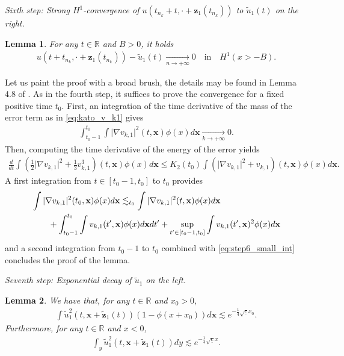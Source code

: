 \documentclass[reqno,10pt]{amsart}
\newtheorem{lemm}{Lemma}[section]
\numberwithin{equation}{section}
\newcommand{\bx}{\mathbf{x}}
\newcommand{\bz}{\mathbf{z}}
\begin{document}
		\vspace{0.5cm}
  \noindent\textit{Sixth step: Strong $H^1$-convergence of $u\left(t_{n_k}+t, \cdot + \bz_1(t_{n_k}) \right)$ to $\tilde{u}_{1}(t)$ on the right.}
		
		\begin{lemm}
			For any $t\in \mathbb{R}$ and $B>0$, it holds
			\begin{align*}
				u \left( t+t_{n_k}, \cdot + \bz_1(t_{n_k}) \right) - \tilde{u}_{1}(t) \underset{n \rightarrow + \infty}{\rightarrow} 0 \quad \text{in} \quad H^1(x>-B).
			\end{align*}
		\end{lemm}
		
		Let us paint the proof with a broad brush, the details may be found in Lemma 4.8 of \cite{CMPS16}. As in the fourth step, it suffices to prove the convergence for a fixed positive time $t_0$. First, an integration of the time derivative of the mass of the error term as in \eqref{eq:kato_v_k1} gives
		\begin{align}\label{eq:step6_small_int}
			\int_{t_0-1}^{t_0} \int \vert \nabla v_{k,1} \vert^2(t, \bx) \phi (x) d\bx \underset{k \rightarrow +\infty}{\rightarrow} 0.
		\end{align}
		Then, computing the time derivative of the energy of the error yields
		\begin{align*}
			\frac{d}{dt} \int \left( \frac12 \vert \nabla v_{k,1} \vert^2 + \frac13 v_{k,1}^3 \right) (t,\bx) \phi(x) d\bx \leq K_2(t_0) \int \left( \vert \nabla v_{k,1} \vert ^2 + v_{k,1} \right)(t,\bx) \phi(x) d\bx.
		\end{align*}
		A first integration from $t \in [t_0-1,t_0]$ to $t_0$ provides
		\begin{align*}
			\MoveEqLeft
			\int \vert \nabla v_{k,1} \vert^2 (t_0,\bx) \phi(x) d\bx \lesssim_{t_0} \int \vert \nabla v_{k,1} \vert^2 (t, \bx) \phi(x) d\bx \\
			& + \int_{t_0-1}^{t_0} \int v_{k,1} (t',\bx) \phi(x) d\bx dt' + \sup_{t' \in [t_0-1,t_0]} \int v_{k,1} (t',\bx)^2 \phi(x) d\bx 
		\end{align*}
		and a second integration from $t_0-1$ to $t_0$ combined with \eqref{eq:step6_small_int} concludes the proof of the lemma.
		
		
		\vspace{0.5cm}
  \noindent\textit{Seventh step: Exponential decay of $\tilde{u}_1$ on the left.}
    \begin{lemm} \label{lemm:mono_left}
			We have that, for any $t\in \mathbb{R}$ and $x_0>0$,
			\begin{align*}
				\int \tilde{u}_1^2\left(t,\bx + \tilde{\bz}_1(t) \right) \left( 1- \phi(x+x_0) \right) d\bx \lesssim e^{-\frac14 \sqrt{\underline{c}} x_0}.
			\end{align*}
			Furthermore, for any $t\in \mathbb{R}$ and $x<0$,
			\begin{align*}
				\int_y \tilde{u}_1^2\left(t,\bx+ \tilde{\bz}_1(t) \right) dy \lesssim e^{-\frac14 \sqrt{\underline{c}} x}.
			\end{align*}
		\end{lemm}
		
\end{document}
